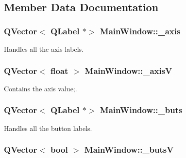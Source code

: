 \subsection{Member Data Documentation}
\hypertarget{a00005_a30c99d7a544f74b0650758e5cc7ead5a}{}
\subsubsection[{\+\_\+axis}]{\setlength{\rightskip}{0pt plus 5cm}Q\+Vector$<$ Q\+Label $\ast$$>$ Main\+Window\+::\+\_\+axis\hspace{0.3cm}{\ttfamily [private]}}\label{a00005_a30c99d7a544f74b0650758e5cc7ead5a}


Handles all the axis labels. 

\hypertarget{a00005_a20f66f574ed4c96d8dfc0013e1095f15}{}
\subsubsection[{\+\_\+axis\+V}]{\setlength{\rightskip}{0pt plus 5cm}Q\+Vector$<$ float $>$ Main\+Window\+::\+\_\+axis\+V\hspace{0.3cm}{\ttfamily [private]}}\label{a00005_a20f66f574ed4c96d8dfc0013e1095f15}


Contains the axis value;. 

\hypertarget{a00005_a8eaf474e1b8672f32873ed009e28ce8a}{}
\subsubsection[{\+\_\+buts}]{\setlength{\rightskip}{0pt plus 5cm}Q\+Vector$<$ Q\+Label $\ast$$>$ Main\+Window\+::\+\_\+buts\hspace{0.3cm}{\ttfamily [private]}}\label{a00005_a8eaf474e1b8672f32873ed009e28ce8a}


Handles all the button labels. 

\hypertarget{a00005_a519ae4630572cb63fbd04bce12fe8e77}{}
\subsubsection[{\+\_\+buts\+V}]{\setlength{\rightskip}{0pt plus 5cm}Q\+Vector$<$ bool $>$ Main\+Window\+::\+\_\+buts\+V\hspace{0.3cm}{\ttfamily [private]}}\label{a00005_a519ae4630572cb63fbd04bce12fe8e77}


